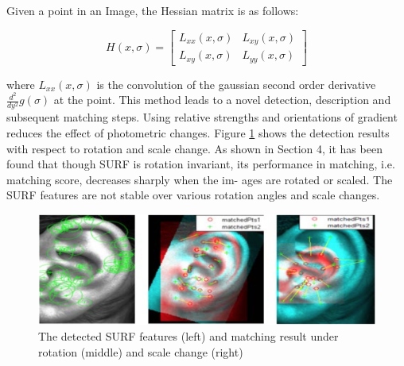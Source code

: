 Given a point in an Image, the Hessian matrix is as follows:

\[
H(x,\sigma) =  
	\begin{bmatrix}
		L_{xx}(x,\sigma) &  L_{xy}(x,\sigma)\\
		L_{xy}(x,\sigma) &  L_{yy}(x,\sigma)
	\end{bmatrix}
\]

where $L_{xx}(x,\sigma)$ is the convolution of the gaussian second order derivative 
$\frac{d^2}{dy^2}g(\sigma)$ at the point. This method leads to a novel detection, description and subsequent matching steps. Using relative strengths and orientations of gradient reduces the effect of photometric changes. Figure \ref{fig:Figure9} shows the detection results with respect to rotation and scale change. As shown in Section 4, it has been found that though SURF is rotation invariant, its performance in matching, i.e. matching score, decreases sharply when the im- ages are rotated or scaled. The SURF features are not stable over various rotation angles and scale changes.
\\ 
\begin{figure}
	\includegraphics[width=\textwidth]{Figures/Figure9}
	\caption{The detected SURF features (left) and matching result under rotation (middle) and scale change (right)}
	\label{fig:Figure9}
\end{figure}

